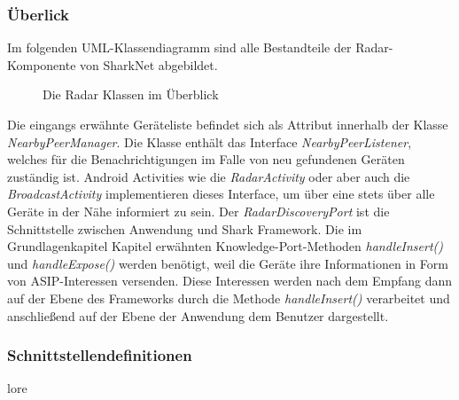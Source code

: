 \subsubsection{Überlick}\label{ch:radaroverview}
Im folgenden UML-Klassendiagramm sind alle Bestandteile der Radar-Komponente von SharkNet abgebildet.
\begin{figure}[H]
	\centering
	\hspace*{1cm}
	\caption{Die Radar Klassen im Überblick}
	\label{fig:radarhAll}
\end{figure}
Die eingangs erwähnte Geräteliste befindet sich als Attribut innerhalb der Klasse \textit{NearbyPeerManager}. Die Klasse enthält das Interface \textit{NearbyPeerListener}, welches für die Benachrichtigungen im Falle von neu gefundenen Geräten zuständig ist. Android Activities wie die \textit{RadarActivity} oder aber auch die \textit{BroadcastActivity} implementieren dieses Interface, um über eine stets über alle Geräte in der Nähe informiert zu sein. Der \textit{RadarDiscoveryPort} ist die Schnittstelle zwischen Anwendung und Shark Framework. Die im Grundlagenkapitel Kapitel erwähnten Knowledge-Port-Methoden \textit{handleInsert()} und \textit{handleExpose()} werden benötigt, weil die Geräte ihre Informationen in Form von ASIP-Interessen versenden. Diese Interessen werden nach dem Empfang dann auf der Ebene des Frameworks durch die Methode \textit{handleInsert()} verarbeitet und anschließend auf der Ebene der Anwendung dem Benutzer dargestellt.

\subsubsection{Schnittstellendefinitionen}\label{ch:radarinterfaces}
lore

